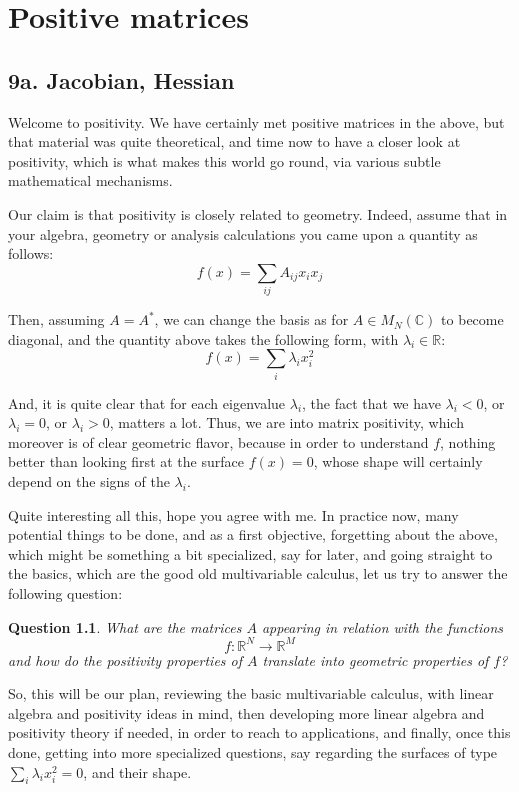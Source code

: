 \documentclass[12pt]{amsbook}
\newtheorem{question}[theorem]{Question}
\begin{document}
\chapter{Positive matrices}

\section*{9a. Jacobian, Hessian}

Welcome to positivity. We have certainly met positive matrices in the above, but that material was quite theoretical, and time now to have a closer look at positivity, which is what makes this world go round, via various subtle mathematical mechanisms.

\bigskip

Our claim is that positivity is closely related to geometry. Indeed, assume that in your algebra, geometry or analysis calculations you came upon a quantity as follows:
$$f(x)=\sum_{ij}A_{ij}x_ix_j$$

Then, assuming $A=A^*$, we can change the basis as for $A\in M_N(\mathbb C)$ to become diagonal, and the quantity above takes the following form, with $\lambda_i\in\mathbb R$:
$$f(x)=\sum_i\lambda_ix_i^2$$

And, it is quite clear that for each eigenvalue $\lambda_i$, the fact that we have $\lambda_i<0$, or $\lambda_i=0$, or $\lambda_i>0$, matters a lot. Thus, we are into matrix positivity, which moreover is of clear geometric flavor, because in order to understand $f$, nothing better than looking first at the surface $f(x)=0$, whose shape will certainly depend on the signs of the $\lambda_i$.

\bigskip

Quite interesting all this, hope you agree with me. In practice now, many potential things to be done, and as a first objective, forgetting about the above, which might be something a bit specialized, say for later, and going straight to the basics, which are the good old multivariable calculus, let us try to answer the following question:

\begin{question}
What are the matrices $A$ appearing in relation with the functions
$$f:\mathbb R^N\to\mathbb R^M$$
and how do the positivity properties of $A$ translate into geometric properties of $f$? 
\end{question}

So, this will be our plan, reviewing the basic multivariable calculus, with linear algebra and positivity ideas in mind, then developing more linear algebra and positivity theory if needed, in order to reach to applications, and finally, once this done, getting into more specialized questions, say regarding the surfaces of type $\sum_i\lambda_ix_i^2=0$, and their shape. 
\end{document}

